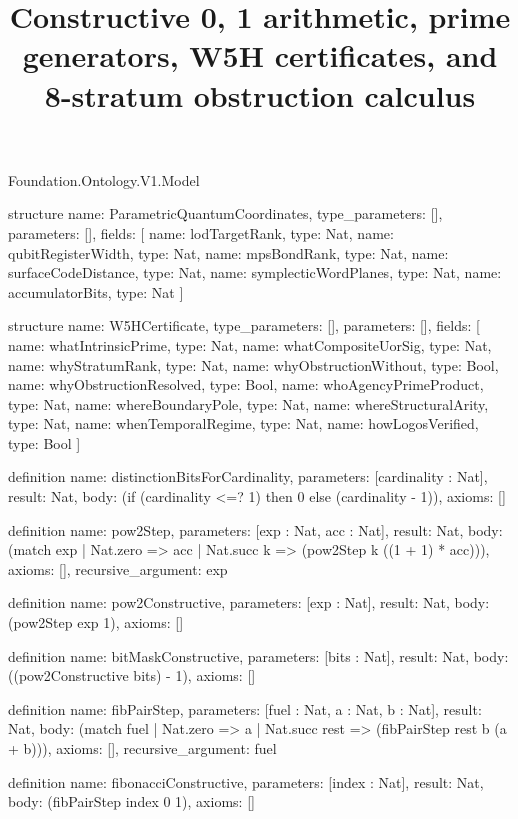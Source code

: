 \begin{lexlean}{Foundation.Ontology.V1.Model}
\title{Constructive {0, 1} arithmetic, prime generators, W5H certificates, and 8-stratum obstruction calculus}

\begin{semanticmodule}

structure{
  name: ParametricQuantumCoordinates,
  type_parameters: [],
  parameters: [],
  fields: [
    {name: lodTargetRank, type: Nat},
    {name: qubitRegisterWidth, type: Nat},
    {name: mpsBondRank, type: Nat},
    {name: surfaceCodeDistance, type: Nat},
    {name: symplecticWordPlanes, type: Nat},
    {name: accumulatorBits, type: Nat}
  ]
}

structure{
  name: W5HCertificate,
  type_parameters: [],
  parameters: [],
  fields: [
    {name: whatIntrinsicPrime, type: Nat},
    {name: whatCompositeUorSig, type: Nat},
    {name: whyStratumRank, type: Nat},
    {name: whyObstructionWithout, type: Bool},
    {name: whyObstructionResolved, type: Bool},
    {name: whoAgencyPrimeProduct, type: Nat},
    {name: whereBoundaryPole, type: Nat},
    {name: whereStructuralArity, type: Nat},
    {name: whenTemporalRegime, type: Nat},
    {name: howLogosVerified, type: Bool}
  ]
}

definition{
  name: distinctionBitsForCardinality,
  parameters: [cardinality : Nat],
  result: Nat,
  body: (if (cardinality <=? 1) then 0 else (cardinality - 1)),
  axioms: []
}

definition{
  name: pow2Step,
  parameters: [exp : Nat, acc : Nat],
  result: Nat,
  body: (match exp
    | Nat.zero => acc
    | Nat.succ k => (pow2Step k ((1 + 1) * acc))),
  axioms: [],
  recursive_argument: exp
}

definition{
  name: pow2Constructive,
  parameters: [exp : Nat],
  result: Nat,
  body: (pow2Step exp 1),
  axioms: []
}

definition{
  name: bitMaskConstructive,
  parameters: [bits : Nat],
  result: Nat,
  body: ((pow2Constructive bits) - 1),
  axioms: []
}

definition{
  name: fibPairStep,
  parameters: [fuel : Nat, a : Nat, b : Nat],
  result: Nat,
  body: (match fuel
    | Nat.zero => a
    | Nat.succ rest => (fibPairStep rest b (a + b))),
  axioms: [],
  recursive_argument: fuel
}

definition{
  name: fibonacciConstructive,
  parameters: [index : Nat],
  result: Nat,
  body: (fibPairStep index 0 1),
  axioms: []
}


\end{semanticmodule}
\end{lexlean}
